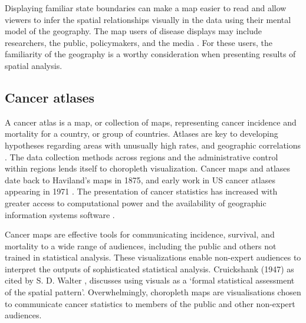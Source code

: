 \documentclass{monashthesis}
\begin{document}
Displaying familiar state boundaries can make a map easier to read \autocite{CIBMUK} and allow viewers to infer the spatial relationships visually in the data using their mental model of the geography. The map users of disease displays may include researchers, the public, policymakers, and the media \autocite{CPISACA}. For these users, the familiarity of the geography is a worthy consideration when presenting results of spatial analysis.

\hypertarget{public}{%
\subsection{Cancer atlases}\label{public}}

A cancer atlas is a map, or collection of maps, representing cancer incidence and mortality for a country, or group of countries. Atlases are key to developing hypotheses regarding areas with unusually high rates, and geographic correlations \autocite{MACM}. The data collection methods across regions and the administrative control within regions lends itself to choropleth visualization. Cancer maps and atlases date back to Haviland's maps in 1875, and early work in US cancer atlases appearing in 1971 \autocite{burbank}. The presentation of cancer statistics has increased with greater access to computational power and the availability of geographic information systems software \autocite{SE}.

Cancer maps are effective tools for communicating incidence, survival, and mortality to a wide range of audiences, including the public and others not trained in statistical analysis. These visualizations enable non-expert audiences to interpret the outputs of sophisticated statistical analysis. Cruickshank (1947) as cited by S. D. Walter \autocite{DMAHP}, discusses using visuals as a `formal statistical assessment of the spatial pattern'. Overwhelmingly, choropleth maps are visualisations chosen to communicate cancer statistics to members of the public and other non-expert audiences.
\end{document}
